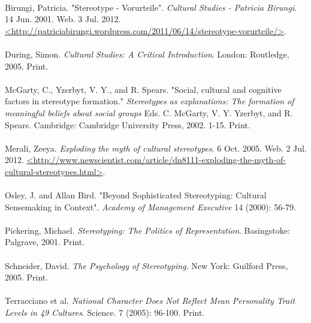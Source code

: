 \paragraph{}
Birungi, Patricia. "Stereotype - Vorurteile". \emph{Cultural Studies - Patricia Birungi}. 14 Jun. 2001. Web. 3 Jul. 2012. \url{<http://patriciabirungi.wordpress.com/2011/06/14/stereotype-vorurteile/>}.
\paragraph{}
During, Simon. \emph{Cultural Studies: A Critical Introduction}. London: Routledge, 2005. Print.
\paragraph{}
McGarty, C., Yzerbyt, V. Y., and R. Spears. "Social, cultural and cognitive factors in stereotype formation." \emph{Stereotypes as explanations: The formation of meaningful beliefs about social groups} Eds. C. McGarty, V. Y. Yzerbyt, and R. Spears. Cambridge: Cambridge University Press, 2002. 1-15. Print.
\paragraph{}
Merali, Zeeya. \emph{Exploding the myth of cultural stereotypes}. 6 Oct. 2005. Web. 2 Jul. 2012. \url{<http://www.newscientist.com/article/dn8111-exploding-the-myth-of-cultural-stereotypes.html>}.
\paragraph{}
Osley, J. and Allan Bird. "Beyond Sophisticated Stereotyping: Cultural Sensemaking in Context". \emph{Academy of Management Executive} 14 (2000): 56-79. 
\paragraph{}
Pickering, Michael. \emph{Stereotyping: The Politics of Representation}. Basingstoke: Palgrave, 2001. Print.
\paragraph{}
Schneider, David. \emph{The Psychology of Stereotyping}. New York: Guilford Press, 2005. Print.
\paragraph{}
Terracciano et al. \emph{National Character Does Not Reflect Mean Personality Trait Levels in 49 Cultures}. Science. 7 (2005): 96-100. Print.
